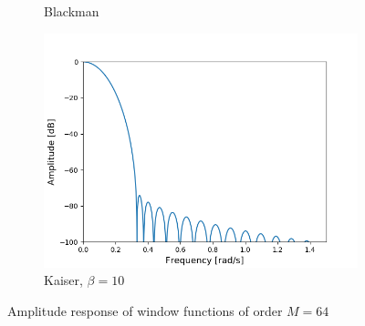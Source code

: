 \begin{figure}[H]
\begin{subfigure}{0.49\textwidth}
\caption{Blackman}
\includegraphics[width=\textwidth]{figures/dbplots/stft_bilag/64/kaiser10.png}
\caption{Kaiser, $\beta=10$}
\end{subfigure}

\caption{Amplitude response of window functions of order $M=64$}
\label{fig:db_plots_64}
\end{figure}

